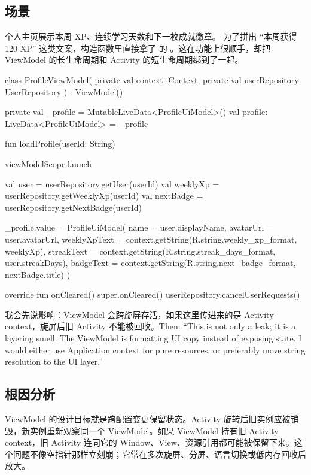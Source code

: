 
\subsection*{场景}
个人主页展示本周 XP、连续学习天数和下一枚成就徽章。 为了拼出 “本周获得 120 XP” 这类文案，构造函数里直接拿了  的 。这在功能上很顺手，却把 ViewModel 的长生命周期和 Activity 的短生命周期绑到了一起。

\begin{ktbug}
class ProfileViewModel(
    private val context: Context,
    private val userRepository: UserRepository
) : ViewModel() {
    private val _profile = MutableLiveData<ProfileUiModel>()
    val profile: LiveData<ProfileUiModel> = _profile

    fun loadProfile(userId: String) {
        viewModelScope.launch {
            val user = userRepository.getUser(userId)
            val weeklyXp = userRepository.getWeeklyXp(userId)
            val nextBadge = userRepository.getNextBadge(userId)

            _profile.value = ProfileUiModel(
                name = user.displayName,
                avatarUrl = user.avatarUrl,
                weeklyXpText = context.getString(R.string.weekly_xp_format, weeklyXp),
                streakText = context.getString(R.string.streak_days_format, user.streakDays),
                badgeText = context.getString(R.string.next_badge_format, nextBadge.title)
            )
        }
    }

    override fun onCleared() {
        super.onCleared()
        userRepository.cancelUserRequests()
    }
}
\end{ktbug}

\begin{sayit}[面试里怎么说]
我会先说影响：ViewModel 会跨旋屏存活，如果这里传进来的是 Activity context，旋屏后旧 Activity 不能被回收。Then: ``This is not only a leak; it is a layering smell. The ViewModel is formatting UI copy instead of exposing state. I would either use Application context for pure resources, or preferably move string resolution to the UI layer.''
\end{sayit}

\subsection*{根因分析}
ViewModel 的设计目标就是跨配置变更保留状态。Activity 旋转后旧实例应被销毁，新实例重新观察同一个 ViewModel。如果 ViewModel 持有旧 Activity context，旧 Activity 连同它的 Window、View、资源引用都可能被保留下来。这个问题不像空指针那样立刻崩；它常在多次旋屏、分屏、语言切换或低内存回收后放大。

